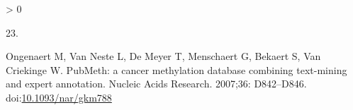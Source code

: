 \documentclass[10pt,letterpaper]{article}
\newlength{\csllabelwidth}
\newlength{\cslhangindent}
\newenvironment{CSLReferences}[2] %
 {%
  \setlength{\parindent}{0pt}
  \ifodd #1 \everypar{\setlength{\hangindent}{\cslhangindent}}\ignorespaces\fi
  \ifnum #2 > 0
  \setlength{\parskip}{#2\baselineskip}
  \fi
 }%
 {}
\newcommand{\CSLLeftMargin}[1]{\parbox[t]{\csllabelwidth}{#1}}
\newcommand{\CSLRightInline}[1]{\parbox[t]{\linewidth - \csllabelwidth}{#1}\break}
\begin{document}
\begin{CSLReferences}{0}{0}
\leavevmode\hypertarget{ref-Ongenaert2007}{}%
\CSLLeftMargin{23. }
\CSLRightInline{Ongenaert M, Van Neste L, De Meyer T, Menschaert G,
Bekaert S, Van Criekinge W. {PubMeth: a cancer methylation database
combining text-mining and expert annotation}. Nucleic Acids Research.
2007;36: D842--D846.
doi:\href{https://doi.org/10.1093/nar/gkm788}{10.1093/nar/gkm788}}

\end{CSLReferences}

\nolinenumbers
\end{document}
